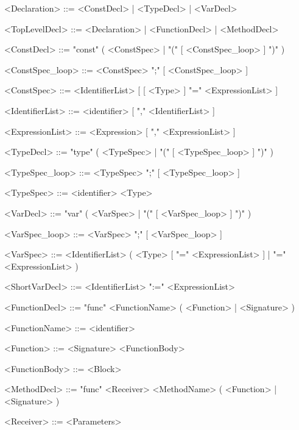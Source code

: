 \documentclass{article}
\begin{document}
    \begin{grammar}


        <Declaration>       ::=     <ConstDecl> | <TypeDecl> | <VarDecl>

        <TopLevelDecl>      ::=     <Declaration> | <FunctionDecl> | <MethodDecl>

        <ConstDecl>         ::=     "const" ( <ConstSpec> | "(" [ <ConstSpec_loop> ] ")" )

        <ConstSpec_loop>    ::=     <ConstSpec> ";" [ <ConstSpec_loop> ]

        <ConstSpec>         ::=     <IdentifierList> [ [ <Type> ] "=" <ExpressionList> ]

        <IdentifierList>    ::=     <identifier> [ "," <IdentifierList> ]


        <ExpressionList>    ::=     <Expression> [ "," <ExpressionList> ]

        <TypeDecl>          ::=     "type" ( <TypeSpec> | "(" [ <TypeSpec_loop> ] ")" )

        <TypeSpec_loop>     ::=     <TypeSpec> ";" [ <TypeSpec_loop> ]

        <TypeSpec>          ::=     <identifier> <Type>

        <VarDecl>           ::=     "var" ( <VarSpec> | "(" [ <VarSpec_loop> ] ")" )

        <VarSpec_loop>      ::=     <VarSpec> ";" [ <VarSpec_loop> ]

        <VarSpec>           ::=     <IdentifierList> ( <Type> [ "=" <ExpressionList> ] | "=" <ExpressionList> )

        <ShortVarDecl>      ::=     <IdentifierList> ":=" <ExpressionList>

        <FunctionDecl>      ::=     "func" <FunctionName> ( <Function> | <Signature> )

        <FunctionName>      ::=     <identifier>

        <Function>          ::=     <Signature> <FunctionBody>

        <FunctionBody>      ::=     <Block>

        <MethodDecl>          ::=     "func" <Receiver> <MethodName> ( <Function> | <Signature> )

        <Receiver>            ::=     <Parameters>

    \end{grammar}
\end{document}
